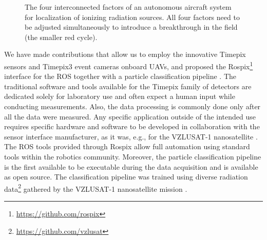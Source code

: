 \documentclass[a4paper,11pt,twoside,openright]{book}
\begin{document}
\begin{figure}
\begin{adjustbox}{max totalsize={1.0\textwidth}{0.90\textheight}, center}
\begin{tikzpicture}[node distance=1cm, auto,]

    \end{tikzpicture}


  \end{adjustbox}

  \caption{The four interconnected factors of an autonomous aircraft system for localization of ionizing radiation sources. All four factors need to be adjusted simultaneously to introduce a breakthrough in the field (the smaller red cycle).}
  \label{fig:radiation_cycle}

\end{figure}


We have made contributions that allow us to employ the innovative Timepix sensors and Timepix3 event cameras onboard \acp{UAV}, and proposed the Rospix\footnote{\url{https://github.com/rospix}} interface \cite{baca2018rospix} for the \acl{ROS} together with a particle classification pipeline \cite{baca2019timepix}.
The traditional software and tools available for the Timepix family of detectors are dedicated solely for laboratory use and often expect a human input while conducting measurements.
Also, the data processing is commonly done only after all the data were measured.
Any specific application outside of the intended use requires specific hardware and software to be developed in collaboration with the sensor interface manufacturer, as it was, e.g., for the VZLUSAT-1 nanosatellite \cite{baca2016embedded}.
The \ac{ROS} tools provided through Rospix allow full automation using standard tools within the robotics community.
Moreover, the particle classification pipeline is the first available to be executable during the data acquisition and is available as open source.
The classification pipeline was trained using diverse radiation data\footnote{\url{https://github.com/vzlusat}} gathered by the VZLUSAT-1 nanosatellite mission \cite{baca2018timepix}.
\end{document}
